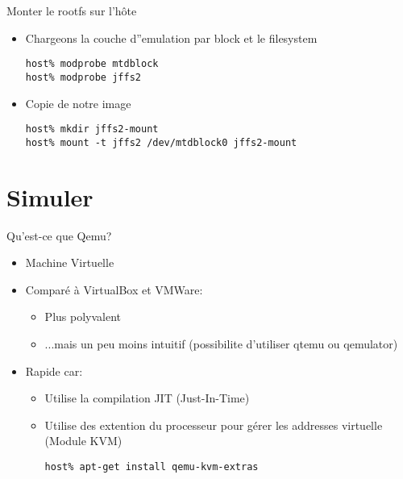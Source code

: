 \begin{frame}[fragile=singleslide]{Monter le rootfs sur l'hôte}
  \begin{itemize} 
  \item Chargeons la couche d''emulation par block et le filesystem
    \begin{lstlisting}
host% modprobe mtdblock
host% modprobe jffs2
    \end{lstlisting}
  \item Copie de notre image
    \begin{lstlisting} 
host% mkdir jffs2-mount
host% mount -t jffs2 /dev/mtdblock0 jffs2-mount
    \end{lstlisting} 
  \end{itemize}
\end{frame}


\section{Simuler}

\begin{frame}[fragile=singleslide]{Qu'est-ce que Qemu?}
  \begin{itemize}
  \item Machine Virtuelle
  \item Comparé à VirtualBox et VMWare:
    \begin{itemize}
    \item Plus polyvalent
    \item ...mais un peu  moins intuitif (possibilite d'utiliser qtemu
      ou qemulator)
    \end{itemize}
  \item Rapide car:
    \begin{itemize}
    \item Utilise la compilation JIT (Just-In-Time)
    \item Utilise des extention du processeur pour gérer les
      addresses virtuelle (Module KVM)
      \begin{lstlisting}
host% apt-get install qemu-kvm-extras
      \end{lstlisting}
    \end{itemize}
  \end{itemize}
\end{frame}

